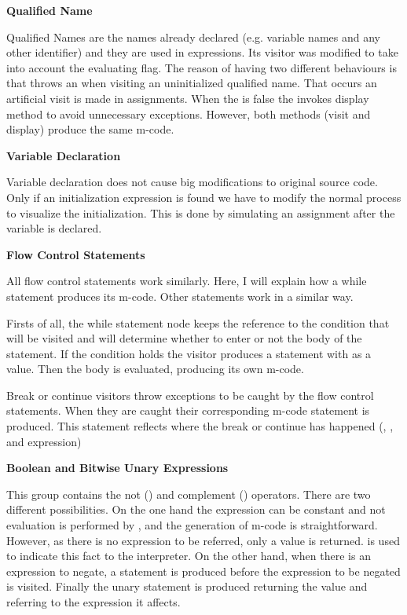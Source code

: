 {\bf{Qualified Name}}

Qualified Names are the names already declared (e.g. variable names and
any other identifier) and they are used in expressions. Its visitor was
modified to take into account the evaluating flag. The reason of having
two different behaviours is that \djava{} throws an 
when visiting an uninitialized qualified name. That occurs an artificial
visit is made in assignments. When the  is false the
\djava{} invokes display method to avoid unnecessary exceptions.
However, both methods (visit and display) produce the same m-code.

{\bf{Variable Declaration}}

Variable declaration does not cause big modifications to original source
code. Only if an initialization expression is found we have to modify
the normal process to visualize the initialization. This is done by
simulating an assignment after the variable is declared.

{\bf{Flow Control Statements}}

All flow control statements work similarly. Here, I will explain how a
while statement produces its m-code. Other statements work in a similar way.

Firsts of all, the while statement node keeps the reference to the
condition that will be visited and will determine whether to enter or
not the body of the statement. If the condition holds the visitor
produces a  statement with  as a value. Then the body
is evaluated, producing its own m-code.

Break or continue visitors throw exceptions to be caught by the flow
control statements. When they are caught their corresponding m-code
statement is produced. This statement reflects where the break or
continue has happened (, ,  and  expression)

{\bf{Boolean and Bitwise Unary Expressions}}

This group contains the not (\p{!}) and complement (\p{\~}) operators.
There are two different possibilities. On the one hand the expression
can be constant and not evaluation is performed by \djava{}, and the
generation of m-code is straightforward. However, as there is no
expression to be referred, only a value is returned. 
is used to indicate this fact to the interpreter. On the other hand, when
there is an expression to negate, a  statement is produced
before the expression to be negated is visited. Finally the unary
statement is produced returning the value and referring to the expression
it affects.

